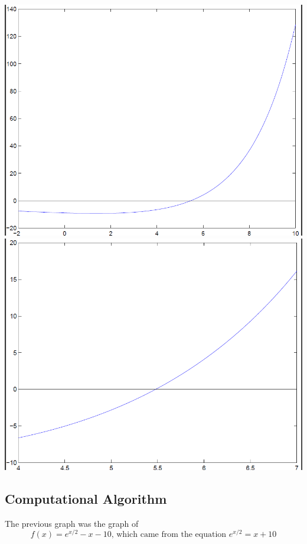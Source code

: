 \newpage

\begin{center}
  \includegraphics[width=7in]{graphics/notes_02_secant_example_graph}
\includegraphics[width=7in]{graphics/notes_02_secant_example_graph_zoom}
\end{center}

\newpage

\subsection*{Computational Algorithm}
The previous graph was the graph of $$f(x) = e^{x/2} -x -10 \mbox{, which
came from the equation } e^{x/2} = x + 10$$

